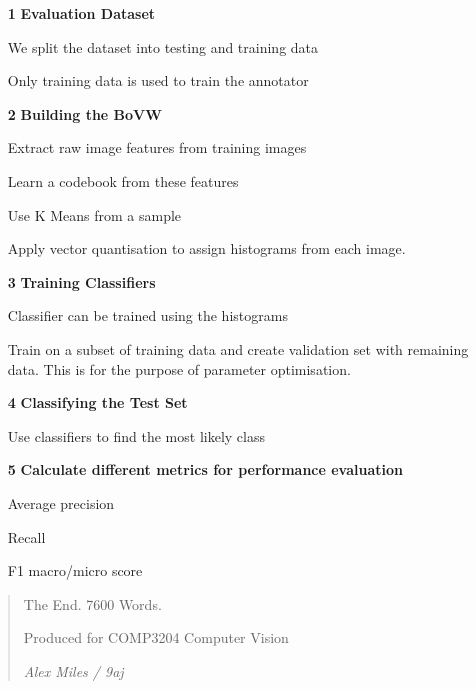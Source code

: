 \begin{itemize}
    \itemsep0em
    \item [\textbf{1}] \textbf{Evaluation Dataset}
    \item []We split the dataset into testing and training data
    \item []Only training data is used to train the annotator
    \item [\textbf{2}] \textbf{Building the BoVW}
    \item []Extract raw image features from training images
    \item []Learn a codebook from these features
    \item []Use K Means from a sample
    \item []Apply vector quantisation to assign histograms from each image.
    \item [\textbf{3}] \textbf{Training Classifiers}
    \item []Classifier can be trained using the histograms
    \item []Train on a subset of training data and create validation set with remaining data. This is for the purpose of parameter optimisation.
    \item [\textbf{4}] \textbf{Classifying the Test Set}
    \item []Use classifiers to find the most likely class
    \item [\textbf{5}] \textbf{Calculate different metrics for performance evaluation}
    \item []Average precision
    \item []Recall
    \item []F1 macro/micro score
\end{itemize}

\hline
\vfill

\begin{quote}
    \centering
    The End.
    7600 Words.
    
    Produced for COMP3204 Computer Vision
    
    \textit{Alex Miles / 9aj}
\end{quote}
